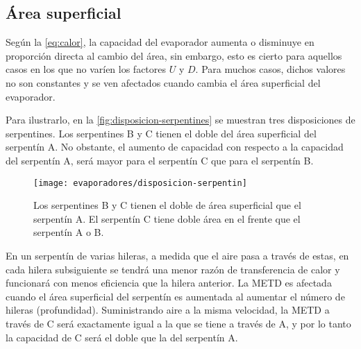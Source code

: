 			\subsection{Área superficial}
				
				
				Según la \autoref{eq:calor}, la capacidad del evaporador aumenta o disminuye en proporción directa al cambio del área, sin embargo, esto es cierto para aquellos casos en los que no varíen los factores $U$ y $D$. Para muchos casos, dichos valores no son constantes y se ven afectados cuando cambia el área superficial del evaporador.
				
				
				Para ilustrarlo, en la \autoref{fig:disposicion-serpentines} se muestran tres disposiciones de serpentines. Los serpentines B y C tienen el doble del área superficial del serpentín A. No obstante, el aumento de capacidad con respecto a la capacidad del serpentín A, será mayor para el serpentín C que para el serpentín B.
				
				
				\begin{figure}[H]\centering

					\texttt{[image: evaporadores/disposicion-serpentin]}
					\caption{Los serpentines B y C tienen el doble de área superficial que el serpentín A. El serpentín C tiene doble área en el frente que el serpentín A o B.}
					\label{fig:disposicion-serpentines}
				\end{figure}
				
				En un serpentín de varias hileras, a medida que el aire pasa a través de estas, en cada hilera subsiguiente se tendrá una menor razón de transferencia de calor y funcionará con menos eficiencia que la hilera anterior. La METD es afectada cuando el área superficial del serpentín es aumentada al aumentar el número de hileras (profundidad). Suministrando aire a la misma velocidad, la METD a través de C será exactamente igual a la que se tiene a través de A, y por lo tanto la capacidad de C será el doble que la del serpentín A.
				

